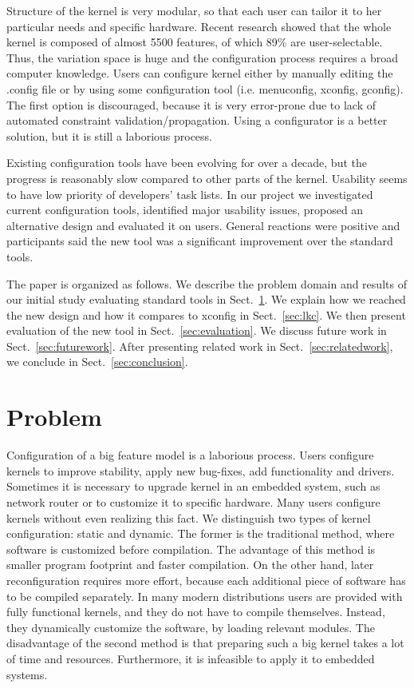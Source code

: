 \documentclass{chi2009}
\newcommand{\secref}[1]{Sect.~\ref{sec:#1}}
\begin{document}
Structure of the kernel is very modular, so that each user can tailor it to her particular needs and specific hardware. Recent research \cite{she:kernel:2010} showed that the whole kernel is composed of almost 5500 features, of which 89\% are user-selectable. Thus, the variation space is huge and the configuration process requires a broad computer knowledge. Users can configure kernel either by manually editing the \textsf{.config} file or by using some configuration tool (i.e. \textsf{menuconfig, xconfig, gconfig}). The first option is discouraged, because it is very error-prone due to lack of automated constraint validation/propagation. Using a configurator is a better solution, but it is still a laborious process.

Existing configuration tools have been evolving for over a decade, but the progress is reasonably slow compared to other parts of the kernel. Usability seems to have low priority of developers' task lists. In our project we investigated current configuration tools, identified major usability issues, proposed an alternative design and evaluated it on users. General reactions were positive and participants said the new tool was a significant improvement over the standard tools.

The paper is organized as follows. We describe the problem domain and results of our initial study evaluating standard tools in \secref{problem}. We explain how we reached the new design and how it compares to \textsf{xconfig} in \secref{lkc}. We then present evaluation of the new tool in \secref{evaluation}. We discuss future work in \secref{futurework}. After presenting related work in \secref{relatedwork}, we conclude in \secref{conclusion}.

\section{Problem}\label{sec:problem}

Configuration of a big feature model is a laborious process. Users configure kernels to improve stability, apply new bug-fixes, add functionality and drivers. Sometimes it is necessary to upgrade kernel in an embedded system, such as network router or to customize it to specific hardware. Many users configure kernels without even realizing this fact. We distinguish two types of kernel configuration: static and dynamic. The former is the traditional method, where software is customized before compilation. The advantage of this method is smaller program footprint and faster compilation. On the other hand, later reconfiguration requires more effort, because each additional piece of software has to be compiled separately. In many modern distributions users are provided with fully functional kernels, and they do not have to compile themselves. Instead, they dynamically customize the software, by loading relevant modules. The disadvantage of the second method is that preparing such a big kernel takes a lot of time and resources. Furthermore, it is infeasible to apply it to embedded systems. 
\end{document}
